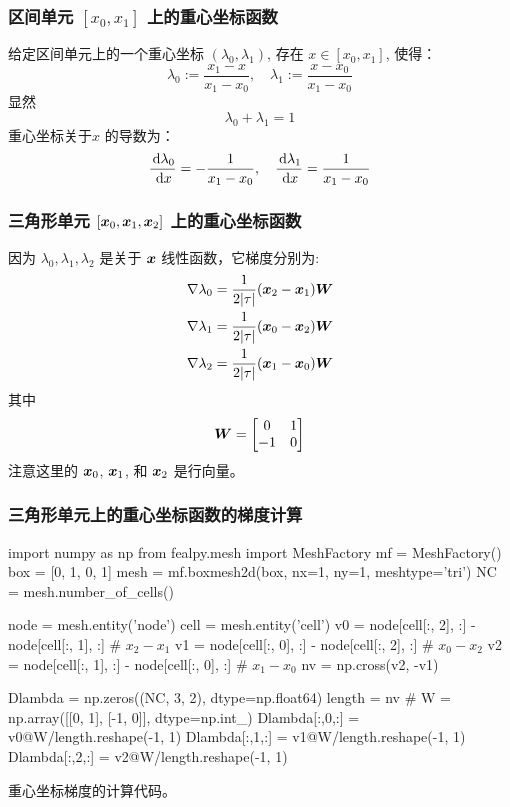 \documentclass{beamer}
\numberwithin{subsection}{section}
\begin{document}
\begin{frame}
    \frametitle{区间单元 $[x_0, x_1]$ 上的重心坐标函数}
给定区间单元上的一个重心坐标 $(\lambda_0, \lambda_1)$, 存在
$ x \in [x_0, x_1]$, 使得：
\[
\lambda_0 := \frac{x_1 - x}{x_1 - x_0}, \quad
\lambda_1 := \frac{x  - x_0}{x_1 - x_0}
\]
显然 
\[
\lambda_0 + \lambda_1 = 1
\]
重心坐标关于$ x $ 的导数为：
\[
\frac{\,\mathrm d \lambda_0}{\,\mathrm d x} = -\frac{1}{x_1 - x_0},\quad
\frac{\,\mathrm d \lambda_1}{\,\mathrm d x} = \frac{1}{x_1 - x_0}
\]
\end{frame}

\begin{frame}
    \frametitle{三角形单元 $[{\boldsymbol x}_0, {\boldsymbol x}_1, {\boldsymbol x}_2]$ 上的重心坐标函数}
因为 $\lambda_0, \lambda_1, \lambda_2$ 是关于 ${\boldsymbol x}$ 线性函数，它梯度分别为:
$$
\begin{aligned}
\nabla\lambda_0 = \frac{1}{2|\tau|}({\boldsymbol x}_2 - {\boldsymbol x}_1){\boldsymbol W}\\
\nabla\lambda_1 = \frac{1}{2|\tau|}({\boldsymbol x}_0 - {\boldsymbol x}_2){\boldsymbol W}\\
\nabla\lambda_2 = \frac{1}{2|\tau|}({\boldsymbol x}_1 - {\boldsymbol x}_0){\boldsymbol W}\\
\end{aligned}
$$
其中 
$$
{\boldsymbol W} = \begin{bmatrix}
0 & 1\\ -1 & 0 
\end{bmatrix}
$$
注意这里的 ${\boldsymbol x}_0$, ${\boldsymbol x}_1$, 和 ${\boldsymbol x}_2$ 是行向量。
\end{frame}

\begin{frame}[fragile]
    \frametitle{三角形单元上的重心坐标函数的梯度计算}
    \begin{listing}[H]
        \tiny
    \begin{pythoncode}
import numpy as np
from fealpy.mesh import MeshFactory
mf = MeshFactory()
box = [0, 1, 0, 1]
mesh = mf.boxmesh2d(box, nx=1, ny=1, meshtype='tri') 
NC = mesh.number_of_cells()

node = mesh.entity('node')
cell = mesh.entity('cell')
v0 = node[cell[:, 2], :] - node[cell[:, 1], :] # $x_2 - x_1$
v1 = node[cell[:, 0], :] - node[cell[:, 2], :] # $x_0 - x_2$
v2 = node[cell[:, 1], :] - node[cell[:, 0], :] # $x_1 - x_0$
nv = np.cross(v2, -v1)

Dlambda = np.zeros((NC, 3, 2), dtype=np.float64)
length = nv # 
W = np.array([[0, 1], [-1, 0]], dtype=np.int_)
Dlambda[:,0,:] = v0@W/length.reshape(-1, 1)
Dlambda[:,1,:] = v1@W/length.reshape(-1, 1)
Dlambda[:,2,:] = v2@W/length.reshape(-1, 1)
    \end{pythoncode}
    \caption{重心坐标梯度的计算代码。}
    \end{listing}
\end{frame}
\end{document}
